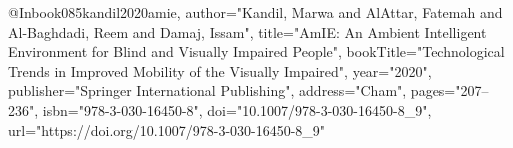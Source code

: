 @Inbook{085kandil2020amie,
author="Kandil, Marwa
and AlAttar, Fatemah
and Al-Baghdadi, Reem
and Damaj, Issam",
title="AmIE: An Ambient Intelligent Environment for Blind and Visually Impaired People",
bookTitle="Technological Trends in Improved Mobility of the Visually Impaired",
year="2020",
publisher="Springer International Publishing",
address="Cham",
pages="207--236",
isbn="978-3-030-16450-8",
doi="10.1007/978-3-030-16450-8_9",
url="https://doi.org/10.1007/978-3-030-16450-8_9"
}